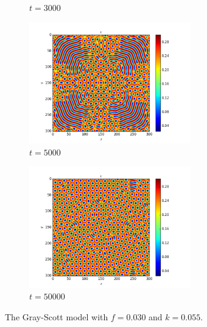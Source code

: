 \documentclass[a4paper]{article}
\begin{document}
\begin{figure}[ht]
\begin{subfigure}[b]{0.5\linewidth}
    \caption{$t = 3000$}
    \label{fig:gs2_3000}
  \end{subfigure}
  \begin{subfigure}[b]{0.5\linewidth}
    \centering
    \includegraphics[width=7cm]{gs2_5000}
    \caption{$t = 5000$}
    \label{fig:gs2_5000}
  \end{subfigure}%
  \begin{subfigure}[b]{0.5\linewidth}
    \centering
    \includegraphics[width=7cm]{gs2_50000}
    \caption{$t = 50000$}
    \label{fig:gs2_50000}
  \end{subfigure}
  \caption{The Gray-Scott model with $f=0.030$ and $k=0.055$.}
  \label{fig:gs2}
\end{figure}



\end{document}
